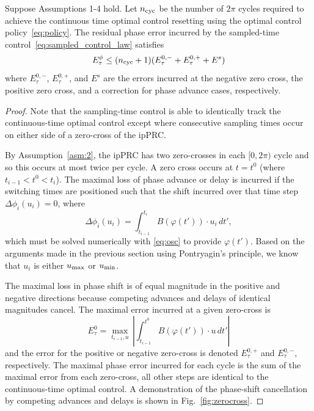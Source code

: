\begin{thm}
    Suppose Assumptions 1-4 hold. Let $n_{\rm cyc}$ be the number of $2\pi$ cycles required to achieve the continuous time optimal control resetting using the optimal control policy~\eqref{eq:policy}. The residual phase error incurred by the sampled-time control~\eqref{eq:sampled_control_law} satisfies
\begin{equation*}
    E^{\phi}_\tau \leq (n_{\rm cyc}+1)(E^{0,-}_\tau +E^{0,+}_\tau + E^s)
\end{equation*}
where $E^{0,-}_\tau$, $E^{0,+}_\tau$, and $E^s$ are the errors incurred at the negative zero cross, the positive zero cross, and a correction for phase advance cases, respectively.
\end{thm}
    \begin{proof}
    Note that the sampling-time control is able to identically track the continuous-time optimal control except where consecutive sampling times occur on either side of a zero-cross of the ipPRC.

    By Assumption~\ref{asm:2}, the ipPRC has two zero-crosses in each $[0,2\pi)$ cycle and so this occurs at most twice per cycle. A zero cross occurs at $t=t^0$ (where $t_{i-1} < t^0 < t_i$).
The maximal loss of phase advance or delay is incurred if the switching times are positioned such that the shift incurred over that time step $\Delta\phi_i(u_i) = 0$, where
\begin{equation}
    \Delta\phi_i(u_i) = \int_{t_{i-1}}^{t_i} B(\varphi(t'))\cdot u_i\,dt',
\end{equation}
which must be solved numerically with \eqref{eq:osc} to provide $\varphi(t')$.
Based on the arguments made in the previous section using Pontryagin's principle, we know that $u_i$ is either $u_{\rm max}$ or $u_{\rm min}$.

The maximal loss in phase shift is of equal magnitude in the positive and negative directions because competing advances and delays of identical magnitudes cancel.
The maximal error incurred at a given zero-cross is
\begin{equation}
    E^0_\tau = \max\limits_{t_{i-1}, u} \,\left| \int_{t_{i-1}}^{t^0} B(\varphi(t'))\cdot u \,dt'\right|%
\end{equation}
and the error for the positive or negative zero-cross is denoted $E^{0,+}_\tau$ and $E^{0,-}_\tau$, respectively.
The maximal phase error incurred for each cycle is the sum of the maximal error from each zero-cross, all other steps are identical to the continuous-time optimal control.
A demonstration of the phase-shift cancellation by competing advances and delays is shown in Fig.~\ref{fig:zerocross}.


\end{proof}

